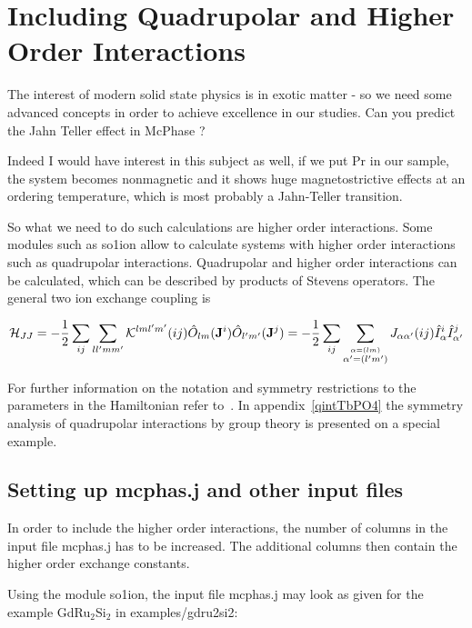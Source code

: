 \section{Including Quadrupolar and Higher Order Interactions}
\label{qint}

\PP The interest of modern solid state physics is in exotic matter - so we need
some advanced concepts in order to achieve excellence in our studies. Can you 
predict the Jahn Teller effect in {\prg McPhase} ?

\OO Indeed I would have interest in this subject as well, if we put Pr in our sample,
the system becomes nonmagnetic and it shows huge magnetostrictive effects at
an ordering temperature, which is most probably a Jahn-Teller transition.

\EE So what we need to do such calculations are higher order interactions.
Some modules such as {\prg so1ion}
 allow  to calculate systems with higher order interactions such
as quadrupolar interactions. Quadrupolar and higher order interactions can be calculated, which
can be described by products of Stevens operators. The general two ion exchange coupling is

\begin{equation}
\label{multipolehamiltonrepeated}
 {\mathcal H}_{JJ}=
             -\frac{1}{2}  \sum_{ij} \sum_ {ll'mm'}
     {\mathcal K}^{lml'm'}(ij) \hat O_{lm}({\mathbf J}^i) \hat O_{l'm'}({\mathbf J}^{j})
=-\frac{1}{2}  \sum_{ij} \sum_{\stackrel{\alpha=(lm)}{ \alpha'=(l'm')}} J_{\alpha\alpha'}(ij) 
\hat I_{\alpha}^i \hat I_{\alpha'}^{j}
\end{equation}

For further information on the notation and symmetry restrictions to the
parameters in the Hamiltonian refer to~\cite{jensen91-1}. In appendix~\ref{qintTbPO4}
the symmetry analysis of quadrupolar interactions by group theory is 
presented on a special example.


\subsection{Setting up {\prg mcphas.j} and other input files}

In order to include the higher order interactions, the number of columns in the input file
{\prg mcphas.j} has to be increased. The additional columns then
 contain the higher order exchange constants.

Using the module {\prg so1ion}, the input file {\prg mcphas.j} may look as given for the 
example GdRu$_2$Si$_2$ in {\prg examples/gdru2si2}:

